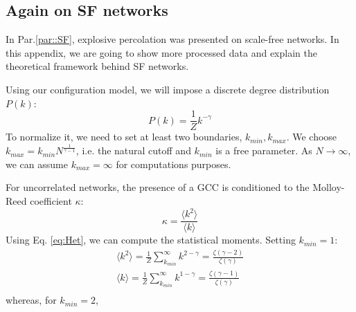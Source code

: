 \subsection{Again on SF networks}
In Par.\ref{par::SF}, explosive percolation was presented on scale-free networks. In this appendix, we are going to show more processed data and explain the theoretical framework behind SF networks.

Using our configuration model, we will impose a discrete degree distribution $P(k)$:
\begin{equation}
	P(k) = \frac{1}{Z} k^{-\gamma}
	\label{eq:Het}
\end{equation}
To normalize it, we need to set at least two boundaries, $k_{min}, k_{max}$. We choose $k_{max} = k_{min} N^{\frac{1}{\gamma - 1}}$, i.e. the natural cutoff and $k_{min}$ is a free parameter. As $N \to \infty$, we can assume $k_{max} = \infty$ for computations purposes. 

For uncorrelated networks, the presence of a GCC is conditioned to the Molloy-Reed coefficient $\kappa$:
$$
\kappa = \frac{\langle k^2 \rangle}{\langle k \rangle}
$$
Using Eq. \ref{eq:Het}, we can compute the statistical moments. Setting $k_{min}=1$:
\begin{equation}
	\begin{aligned}
		\langle k^2 \rangle = \frac{1}{Z} \sum_{k_{min}}^{\infty} k^{2-\gamma} = \frac{\zeta(\gamma-2)}{\zeta(\gamma)}  \\
		\langle k \rangle = \frac{1}{Z} \sum_{k_{min}}^{\infty} k^{1-\gamma} = \frac{\zeta(\gamma-1)}{\zeta(\gamma)}  \\
	\end{aligned}
\end{equation}
whereas, for $k_{min} = 2$, 

